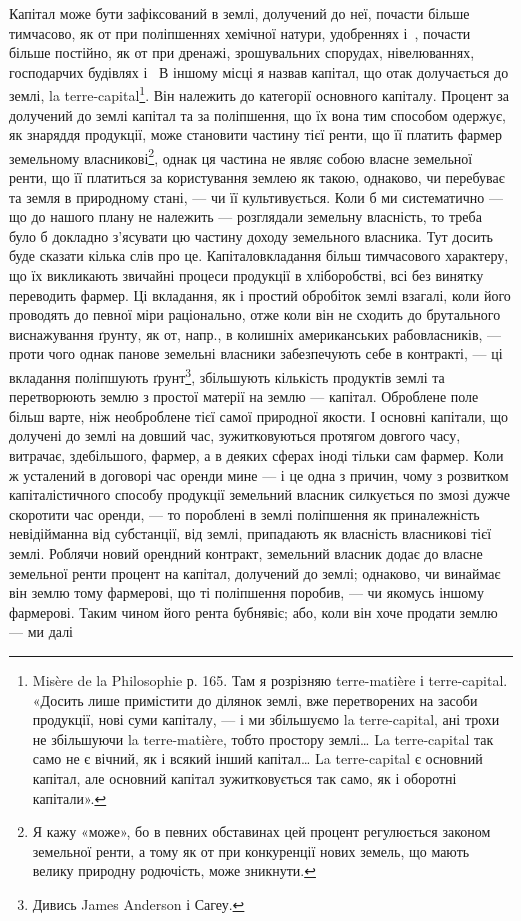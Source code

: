 Капітал може бути зафіксований в землі, долучений до неї, почасти
більше тимчасово, як от при поліпшеннях хемічної натури, удобреннях і~,
почасти більше постійно, як от при дренажі, зрошувальних спорудах, нівелюваннях,
господарчих будівлях і~ В іншому місці я назвав капітал, що
отак долучається до землі, la terre-capital\footnote{
Misère de la Philosophie р. 165. Там я розрізняю terre-matière і terre-capital. «Досить лише
примістити до ділянок землі, вже перетворених на засоби продукції, нові суми капіталу, — і ми
збільшуємо la terre-capital, ані трохи не збільшуючи la terre-matière, тобто простору землі\dots{} La
terre-capital так само не є вічний, як і всякий інший капітал\dots{} La terre-capital є основний
капітал, але основний капітал зужитковується так само, як і оборотні капітали».
}. Він належить до категорії основного
капіталу. Процент за долучений до землі капітал та за поліпшення, що їх вона
тим способом одержує, як знаряддя продукції, може становити частину тієї
ренти, що її платить фармер земельному власникові\footnote{
Я кажу «може», бо в певних обставинах цей процент регулюється законом земельної ренти, а тому як
от при конкуренції нових земель, що мають велику природну родючість, може зникнути.
}, однак ця частина не
являє собою власне земельної ренти, що її платиться за користування землею
як такою, однаково, чи перебуває та земля в природному стані, — чи її культивується.
Коли б ми систематично — що до нашого плану не належить — розглядали
земельну власність, то треба було б докладно з’ясувати цю частину
доходу земельного власника. Тут досить буде сказати кілька слів про це.
Капіталовкладання більш тимчасового характеру, що їх викликають звичайні
процеси продукції в хліборобстві, всі без винятку переводить фармер. Ці вкладання,
як і простий обробіток землі взагалі, коли його проводять до певної
міри раціонально, отже коли він не сходить до брутального виснажування
ґрунту, як от, напр., в колишніх американських рабовласників, — проти чого
однак панове земельні власники забезпечують себе в контракті, — ці вкладання
поліпшують ґрунт\footnote{
Дивись James Anderson і Сагеу.
}, збільшують кількість продуктів землі та перетворюють
землю з простої матерії на землю — капітал. Оброблене поле більш варте, ніж
необроблене тієї самої природної якости. І основні капітали, що долучені до
землі на довший час, зужитковуються протягом довгого часу, витрачає, здебільшого,
фармер, а в деяких сферах іноді тільки сам фармер. Коли ж усталений в
договорі час оренди мине — і це одна з причин, чому з розвитком капіталістичного
способу продукції земельний власник силкується по змозі дужче скоротити
час оренди, — то пороблені в землі поліпшення як приналежність невідійманна
від субстанції, від землі, припадають як власність власникові тієї землі.
Роблячи новий орендний контракт, земельний власник додає до власне земельної
ренти процент на капітал, долучений до землі; однаково, чи винаймає він землю
тому фармерові, що ті поліпшення поробив, — чи якомусь іншому фармерові.
Таким чином його рента бубнявіє; або, коли він хоче продати землю — ми далі
\parbreak{}  %
